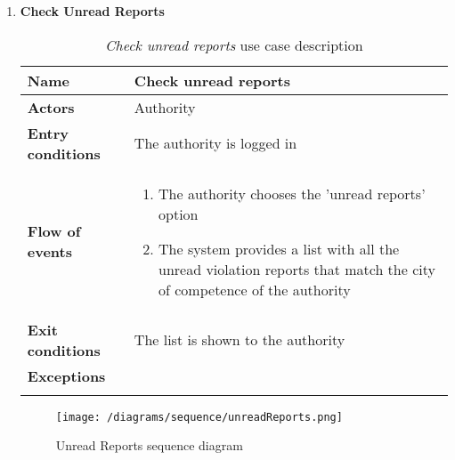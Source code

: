 \begin{enumerate}
			\item \textbf{Check Unread Reports}
				\begin{longtable}{p{0.25\linewidth}p{0.75\linewidth}}
					\toprule
					\textbf{Name} & \textbf{Check unread reports} \\
					\midrule
					\textbf{Actors} & Authority\\
					\midrule
					\textbf{Entry conditions} & The authority is logged in \\
					\midrule
					\textbf{Flow of events} & 
					\begin{enumerate}
						\item The authority chooses the 'unread reports' option
						\item The system provides a list with all the unread violation reports that match the city of competence of the authority
					\end{enumerate} \\
					\midrule
					\textbf{Exit conditions} & The list is shown to the authority\\
					\midrule
					\textbf{Exceptions} &  \\
					\bottomrule
					\caption{\emph{Check unread reports} use case description}
				\end{longtable}
				
				\begin{figure}[h]
					\centering
					\texttt{[image: /diagrams/sequence/unreadReports.png]}
					\caption{Unread Reports sequence diagram}
				\end{figure}
				

\end{enumerate}
